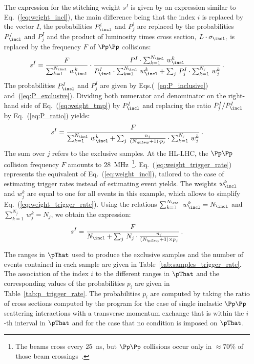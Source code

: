 The expression for the stitching weight $s^{I}$ is given by an expression similar to Eq.~(\ref{eq:weight_incl}),
the main difference being that the index $i$ is replaced by the vector $I$,
the probabilities $P_{\incl}^{i}$ and $P_{j}^{i}$ are replaced by the probabilities $P_{\incl}^{I}$ and $P_{j}^{I}$
and the product of luminosity times cross section, $L \cdot \sigma_{\incl}$, is replaced by the frequency $F$ of $\Pp\Pp$ collisions:
\begin{equation}
s^{I} = \frac{F}{\sum_{k=1}^{N_{\incl}} \, w_{\incl}^{k}} \cdot \frac{P^{I} \cdot \sum_{k=1}^{N_{\incl}} \, w_{\incl}^{k}}{P_{\incl}^{I} \cdot \sum_{k=1}^{N_{\incl}} \, w_{\incl}^{k} + \sum_{j} \, P_{j}^{I} \cdot \sum_{k=1}^{N_{j}} \, w_{j}^{k}} \, .
\label{eq:weight_tmp}
\end{equation}
The probabilities $P_{\incl}^{I}$ and $P_{j}^{I}$ are given by Eqs.(~\ref{eq:P_inclusive}) and~(\ref{eq:P_exclusive}).
Dividing both numerator and denominator on the right-hand side of Eq.~(\ref{eq:weight_tmp}) by $P_{\incl}^{I}$ and replacing the ratio $P_{j}^{I}/P_{\incl}^{I}$ by Eq.~(\ref{eq:P_ratio}) yields:
\begin{equation}
s^{I} = \frac{F}{\sum_{k=1}^{N_{\incl}} \, w_{\incl}^{k} + \sum_{j} \, \frac{n_{j}}{(N_{\pileup} + 1) \cdot p_{j}} \cdot \sum_{k=1}^{N_{j}} \, w_{j}^{k}} \, .
\label{eq:weight_trigger_rate}
\end{equation}
The sum over $j$ refers to the exclusive samples.
At the HL-LHC, the $\Pp\Pp$ collision frequency $F$ amounts to $28$~MHz~\footnote{
  The beams cross every $25$~ns, but $\Pp\Pp$ collisions occur only in $\approx 70\%$ of those beam crossings~\cite{TDR_Phase2_LHC}.}.
Eq.~(\ref{eq:weight_trigger_rate}) represents the equivalent of Eq.~(\ref{eq:weight_incl}),
tailored to the case of estimating trigger rates instead of estimating event yields.
The weights $w_{\incl}^{k}$ and $w_{j}^{k}$ are equal to one for all events in this example,
which allows to simplify Eq.~(\ref{eq:weight_trigger_rate}).
Using the relations $\sum_{k=1}^{N_{\incl}} \, w_{\incl}^{k} = N_{\incl}$ and $\sum_{k=1}^{N_{j}} \, w_{j}^{k} = N_{j}$,
we obtain the expression:
\begin{equation}
s^{I} = \frac{F}{N_{\incl} + \sum_{j} \, N_{j} \cdot \frac{n_{j}}{(N_{\pileup} + 1) \times p_{j}}} \, .
\label{eq:weight_trigger_rate_simplified}
\end{equation}

The ranges in $\pThat$ used to produce the exclusive samples and the number of events contained in each sample
are given in Table~\ref{tab:samples_trigger_rate}.
The association of the index $i$ to the different ranges in $\pThat$ and the 
corresponding values of the probabilities $p_{i}$ are given in Table~\ref{tab:p_trigger_rate}.
The probabilities $p_{i}$ are computed by taking the ratio of cross sections computed by the program \PYTHIA
for the case of single inelastic $\Pp\Pp$ scattering interactions with a transverse momentum exchange that is within the $i$-th interval in $\pThat$
and for the case that no condition is imposed on $\pThat$.

